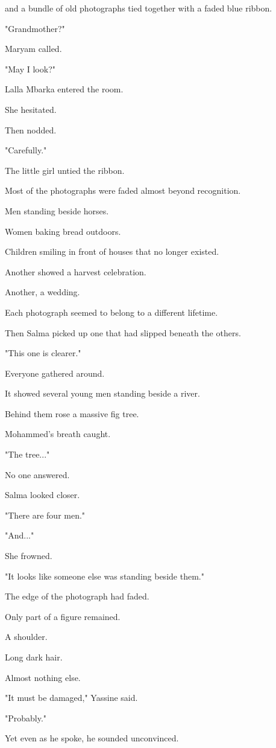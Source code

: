 \documentclass[12pt,openany]{book}
\begin{document}
and a bundle of old photographs tied together with a faded blue ribbon.

"Grandmother?"

Maryam called.

"May I look?"

Lalla Mbarka entered the room.

She hesitated.

Then nodded.

"Carefully."

The little girl untied the ribbon.

Most of the photographs were faded almost beyond recognition.

Men standing beside horses.

Women baking bread outdoors.

Children smiling in front of houses that no longer existed.

Another showed a harvest celebration.

Another, a wedding.

Each photograph seemed to belong to a different lifetime.

Then Salma picked up one that had slipped beneath the others.

"This one is clearer."

Everyone gathered around.

It showed several young men standing beside a river.

Behind them rose a massive fig tree.

Mohammed's breath caught.

"The tree..."

No one answered.

Salma looked closer.

"There are four men."

"And..."

She frowned.

"It looks like someone else was standing beside them."

The edge of the photograph had faded.

Only part of a figure remained.

A shoulder.

Long dark hair.

Almost nothing else.

"It must be damaged," Yassine said.

"Probably."

Yet even as he spoke, he sounded unconvinced.
\end{document}
